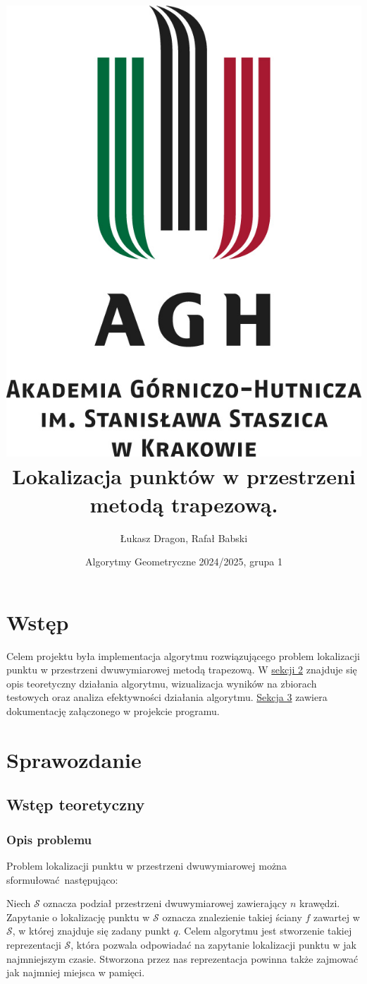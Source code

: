\documentclass[11pt,a4paper]{article}
\title{
    \includegraphics[scale=0.55]{./res/logos/agh_logo_text_sym.jpg}
    \vfill
    Lokalizacja punktów w przestrzeni
    metodą trapezową.
}
\author{Łukasz Dragon, Rafał Babski}
\date{Algorytmy Geometryczne 2024/2025, grupa 1}
\begin{document}
\maketitle
\tableofcontents
\pagebreak

\section{Wstęp}

Celem projektu była implementacja algorytmu rozwiązującego
problem lokalizacji punktu w przestrzeni dwuwymiarowej 
metodą trapezową. W \hyperlink{section.2}{sekcji 2} znajduje się opis teoretyczny
działania algorytmu, wizualizacja wyników na zbiorach testowych
oraz analiza efektywności działania algorytmu. 
\hyperlink{section.3}{Sekcja 3} zawiera dokumentację załączonego w projekcie programu.

\section{Sprawozdanie}

\subsection{Wstęp teoretyczny}

\subsubsection{Opis problemu}
Problem lokalizacji punktu w przestrzeni dwuwymiarowej
można sformułować następująco:

Niech $\mathscr{S}$ oznacza podział przestrzeni dwuwymiarowej
zawierający $n$ krawędzi. Zapytanie o lokalizację punktu w $\mathscr{S}$
oznacza znalezienie takiej ściany $f$ zawartej w $\mathscr{S}$,
w której znajduje się zadany punkt $q$. Celem algorytmu jest
stworzenie takiej reprezentacji $\mathscr{S}$, która pozwala
odpowiadać na zapytanie lokalizacji punktu w jak najmniejszym
czasie. Stworzona przez nas reprezentacja powinna także 
zajmować jak najmniej miejsca w pamięci.
\end{document}
